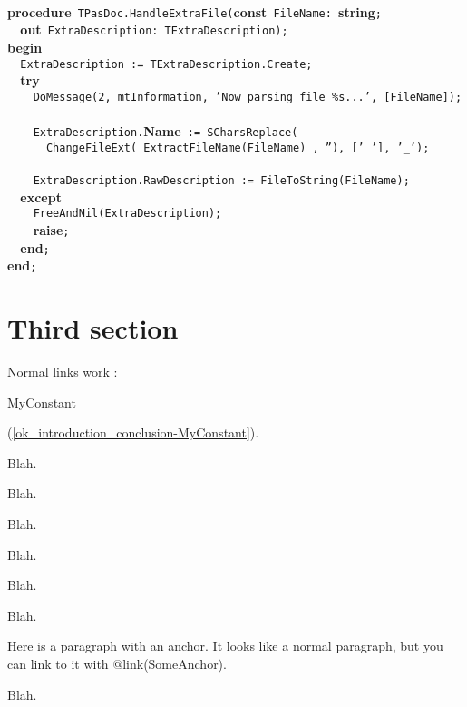 \documentclass{report}
\begin{document}
\texttt{\\\nopagebreak[3]
}\textbf{procedure}\texttt{~TPasDoc.HandleExtraFile(}\textbf{const}\texttt{~FileName:~}\textbf{string}\texttt{;\\\nopagebreak[3]
~~}\textbf{out}\texttt{~ExtraDescription:~TExtraDescription);\\\nopagebreak[3]
}\textbf{begin}\texttt{\\\nopagebreak[3]
~~ExtraDescription~:=~TExtraDescription.Create;\\\nopagebreak[3]
~~}\textbf{try}\texttt{\\\nopagebreak[3]
~~~~DoMessage(2,~mtInformation,~'Now~parsing~file~{\%}s...',~[FileName]);\\\nopagebreak[3]
\\\nopagebreak[3]
~~~~ExtraDescription.}\textbf{Name}\texttt{~:=~SCharsReplace(\\\nopagebreak[3]
~~~~~~ChangeFileExt(~ExtractFileName(FileName)~,~''),~['~'],~'{\_}');\\\nopagebreak[3]
\\\nopagebreak[3]
~~~~ExtraDescription.RawDescription~:=~FileToString(FileName);\\\nopagebreak[3]
~~}\textbf{except}\texttt{\\\nopagebreak[3]
~~~~FreeAndNil(ExtraDescription);\\\nopagebreak[3]
~~~~}\textbf{raise}\texttt{;\\\nopagebreak[3]
~~}\textbf{end}\texttt{;\\\nopagebreak[3]
}\textbf{end}\texttt{;\\
}

\section{Third section}


Normal links work : \begin{ttfamily}MyConstant\end{ttfamily}(\ref{ok_introduction_conclusion-MyConstant}).

Blah.

Blah.

Blah.

Blah.

Blah.

Blah.

 Here is a paragraph with an anchor. It looks like a normal paragraph, but you can link to it with @link(SomeAnchor).

Blah.
\end{document}
